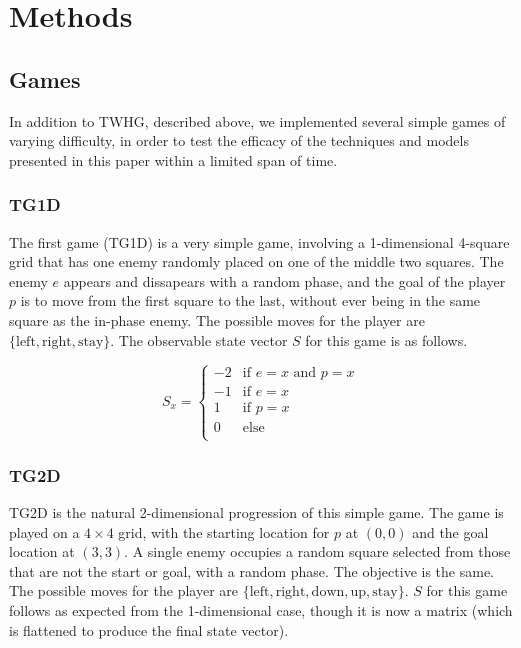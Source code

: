 \documentclass[12pt]{article}
\begin{document}
\section{Methods}

\subsection{Games}

In addition to TWHG, described above, we implemented several simple games of varying difficulty, in order to test the efficacy of the techniques and models presented in this paper within a limited span of time.

\subsubsection{TG1D}

The first game (TG1D) is a very simple game, involving a 1-dimensional 4-square grid that has one enemy randomly placed on one of the middle two squares. The enemy $e$ appears and dissapears with a random phase, and the goal of the player $p$ is to move from the first square to the last, without ever being in the same square as the in-phase enemy. The possible moves for the player are $\{\text{left}, \text{right}, \text{stay}\}$. The observable state vector $S$ for this game is as follows.

\[S_{x} =
\begin{cases}
  -2 & \text{if } e = x \text{ and } p = x \\
  -1 & \text{if } e = x \\
  1 & \text{if }  p = x \\
  0 & \text{else} \\
\end{cases}
\]

\subsubsection{TG2D}

TG2D is the natural 2-dimensional progression of this simple game. The game is played on a $4 \times 4$ grid, with the starting location for $p$ at $(0, 0)$ and the goal location at $(3, 3)$. A single enemy occupies a random square selected from those that are not the start or goal, with a random phase. The objective is the same.  The possible moves for the player are $\{\text{left}, \text{right}, \text{down}, \text{up}, \text{stay}\}$. $S$ for this game follows as expected from the 1-dimensional case, though it is now a matrix (which is flattened to produce the final state vector).
\end{document}
